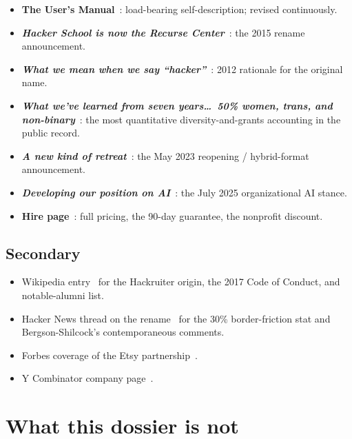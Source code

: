 \documentclass[10pt,letterpaper,twocolumn]{article}
\begin{document}
\begin{itemize}
\item \textbf{The User's Manual}~\citep{rcmanual}: load-bearing self-description; revised continuously.
\item \textbf{\emph{Hacker School is now the Recurse Center}}~\citep{rcrename}: the 2015 rename announcement.
\item \textbf{\emph{What we mean when we say ``hacker''}}~\citep{rchackerpost}: 2012 rationale for the original name.
\item \textbf{\emph{What we've learned from seven years\ldots\ 50\% women, trans, and non-binary}}~\citep{rcseven}: the most quantitative diversity-and-grants accounting in the public record.
\item \textbf{\emph{A new kind of retreat}}~\citep{rcnewretreat}: the May 2023 reopening / hybrid-format announcement.
\item \textbf{\emph{Developing our position on AI}}~\citep{rcaipost}: the July 2025 organizational AI stance.
\item \textbf{Hire page}~\citep{rchirepage}: full pricing, the 90-day guarantee, the nonprofit discount.
\end{itemize}

\subsection{Secondary}

\begin{itemize}
\item Wikipedia entry~\citep{wikipediarc} for the Hackruiter origin, the 2017 Code of Conduct, and notable-alumni list.
\item Hacker News thread on the rename~\citep{hnrenamethread} for the 30\% border-friction stat and Bergson-Shilcock's contemporaneous comments.
\item Forbes coverage of the Etsy partnership~\citep{forbeshackergrants}.
\item Y Combinator company page~\citep{ycrcprofile}.
\end{itemize}

\section{What this dossier is not}
\end{document}
